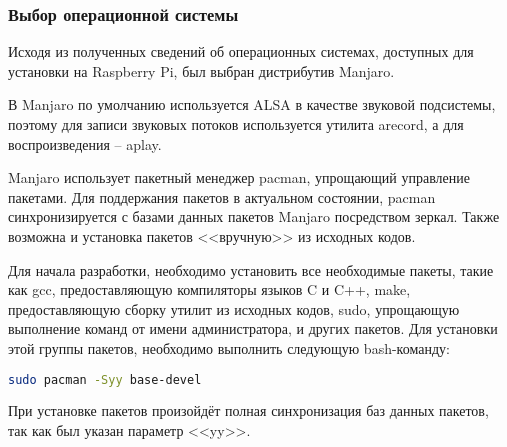 \subsubsection{Выбор операционной системы}

Исходя из полученных сведений об операционных системах, доступных для установки на Raspberry Pi, был выбран дистрибутив Manjaro.

В Manjaro по умолчанию используется ALSA в качестве звуковой подсистемы, поэтому для записи звуковых потоков используется утилита arecord, а для воспроизведения -- aplay.

Manjaro использует пакетный менеджер pacman, упрощающий управление пакетами. Для поддержания пакетов в актуальном состоянии, pacman синхронизируется с базами данных пакетов Manjaro посредством зеркал. Также возможна и установка пакетов <<вручную>> из исходных кодов.

Для начала разработки, необходимо установить все необходимые пакеты, такие как gcc, предоставляющую компиляторы языков C и C++, make, предоставляющую сборку утилит из исходных кодов, sudo, упрощающую выполнение команд от имени администратора, и других пакетов. Для установки этой группы пакетов, необходимо выполнить следующую bash-команду:

\begin{lstlisting}[style=ES6, language=bash]
  sudo pacman -Syy base-devel
\end{lstlisting}

При установке пакетов произойдёт полная синхронизация баз данных пакетов, так как был указан параметр <<yy>>.